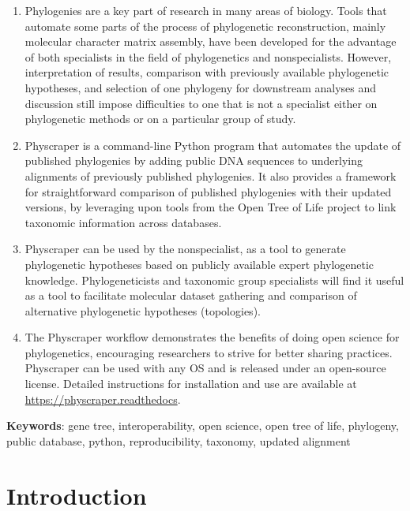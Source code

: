 \documentclass[]{article}
\begin{document}
\begin{enumerate}
\def\labelenumi{\arabic{enumi}.}
\item
  Phylogenies are a key part of research in many areas of biology. Tools that automate
  some parts of the process of phylogenetic reconstruction, mainly molecular character matrix assembly,
  have been developed for the advantage of both specialists in the field of phylogenetics and nonspecialists.
  However, interpretation of results, comparison with previously available phylogenetic
  hypotheses, and selection of one phylogeny for downstream analyses and discussion still impose difficulties
  to one that is not a specialist either on phylogenetic methods or on a particular group of study.
\item
  Physcraper is a command-line Python program that automates the update of published
  phylogenies by adding public DNA sequences to underlying alignments of previously published phylogenies. It also provides a framework for straightforward comparison of published phylogenies with their updated versions, by leveraging upon tools from the Open Tree of Life project to link taxonomic information across databases.
\item
  Physcraper can be used by the nonspecialist, as a tool to generate phylogenetic
  hypotheses based on publicly available expert phylogenetic knowledge.
  Phylogeneticists and taxonomic group specialists will find it useful as a tool to facilitate molecular dataset gathering and comparison
  of alternative phylogenetic hypotheses (topologies).
\item
  The Physcraper workflow demonstrates the benefits of doing open science for phylogenetics, encouraging researchers to strive for better sharing practices. Physcraper can be used with any OS and is released under an open-source license. Detailed instructions for installation and
  use are available at \href{https://physcraper.readthedocs.io}{https://physcraper.readthedocs}.
\end{enumerate}

\textbf{Keywords}: gene tree, interoperability, open science, open tree of life, phylogeny, public database, python, reproducibility, taxonomy, updated alignment

\newpage

\hypertarget{introduction}{%
\section{Introduction}\label{introduction}}
\end{document}

